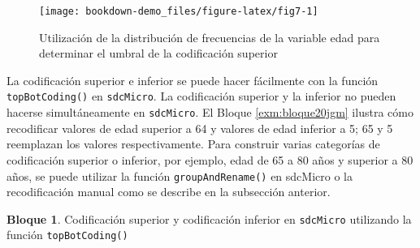 \documentclass[]{book}
\newenvironment{Shaded}{\begin{snugshade}}{\end{snugshade}}
\newcommand{\CommentTok}[1]{\textcolor[rgb]{0.56,0.35,0.01}{\textit{#1}}}
\newcommand{\DataTypeTok}[1]{\textcolor[rgb]{0.13,0.29,0.53}{#1}}
\newcommand{\DecValTok}[1]{\textcolor[rgb]{0.00,0.00,0.81}{#1}}
\newcommand{\KeywordTok}[1]{\textcolor[rgb]{0.13,0.29,0.53}{\textbf{#1}}}
\newcommand{\NormalTok}[1]{#1}
\newcommand{\StringTok}[1]{\textcolor[rgb]{0.31,0.60,0.02}{#1}}
\theoremstyle{definition}
\theoremstyle{definition}
\newtheorem{example}{Bloque}[chapter]
\theoremstyle{definition}
\theoremstyle{definition}
\theoremstyle{remark}
\begin{document}
\begin{figure}
\texttt{[image: bookdown-demo\_files/figure-latex/fig7-1]} \caption{Utilización de la distribución de frecuencias de la variable edad para determinar el umbral de la codificación superior}\label{fig:fig7}
\end{figure}

La codificación superior e inferior se puede hacer fácilmente con la función \texttt{topBotCoding()} en \texttt{sdcMicro}. La codificación superior y la inferior no pueden hacerse simultáneamente en \texttt{sdcMicro}. El Bloque \ref{exm:bloque20jgm} ilustra cómo recodificar valores de edad superior a 64 y valores de edad inferior a 5; 65 y 5 reemplazan los valores respectivamente. Para construir varias categorías de codificación superior o inferior, por ejemplo, edad de 65 a 80 años y superior a 80 años, se puede utilizar la función \texttt{groupAndRename()} en sdcMicro o la recodificación manual como se describe en la subsección anterior.

\begin{example}
\protect\hypertarget{exm:bloque20jgm}{}{\label{exm:bloque20jgm} }Codificación superior y codificación inferior en \texttt{sdcMicro} utilizando la función \texttt{topBotCoding()}
\end{example}

\begin{Shaded}
\end{Shaded}
\end{document}
